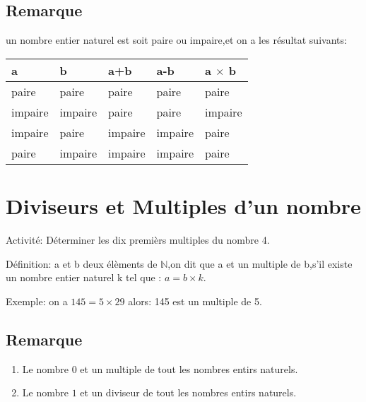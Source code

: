 \documentclass[12pt,a4paper]{book}
\begin{document}
\subsection{Remarque} un nombre entier naturel est soit paire ou impaire,et on a les résultat suivants:

\begin{center}
    \begin{tabular}{|R{2cm}||C{2cm}||L{1.5cm}|L{1.5cm}|L{1.5cm}|}
\hline a & b  &  a+b &  a-b  &  a $\times$ b\\
\hline  paire & paire & paire & paire  & paire  \\
\hline impaire & impaire & paire & paire & impaire  \\
\hline impaire & paire & impaire & impaire & paire\\
\hline paire & impaire & impaire & impaire  & paire \\
\hline
\end{tabular}
\end{center}
\section{Diviseurs et Multiples d'un nombre }
\begin{tcolorbox}[colback=col3,colframe=col4,leftrule=5pt,toprule=0pt,rightrule=0pt,bottomrule=0pt,arc=0pt,outer arc=0pt,top=12pt]

\large Activité: Déterminer les dix premièrs multiples du nombre 4.
\end{tcolorbox}

\begin{tcolorbox}[colback=col3,colframe=col4,leftrule=5pt,toprule=0pt,rightrule=0pt,bottomrule=0pt,arc=0pt,outer arc=0pt,top=12pt]


\large Définition:
a et b deux élèments de $\mathbb{N}$,on dit que a et un multiple de b,s'il existe un nombre entier naturel k tel que : $a=b\times k$.
\end{tcolorbox} 
\begin{tcolorbox}[colback=col6,colframe=col1,leftrule=5pt,toprule=0pt,rightrule=0pt,bottomrule=0pt,arc=0pt,outer arc=0pt,top=12pt]
 
\large Exemple: on a $145= 5 \times 29$ alors: 145 est un multiple de 5.
\end{tcolorbox}
\subsection{Remarque} 
\begin{enumerate}
    \item Le nombre $0$ et un multiple de tout les nombres entirs naturels.
    \item Le nombre $1$ et un diviseur de tout les nombres entirs naturels.
\end{enumerate}
\end{document}
